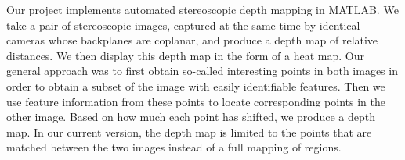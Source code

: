 Our project implements automated stereoscopic depth mapping in MATLAB.  We take a pair of stereoscopic images, captured at the same time by identical cameras whose backplanes are coplanar, and produce a depth map of relative distances. We then display this depth map in the form of a heat map.  Our general approach was to first obtain so-called interesting points in both images in order to obtain a subset of the image with easily identifiable features.  Then we use feature information from these points to locate corresponding points in the other image. Based on how much each point has shifted, we produce a depth map. In our current version, the depth map is limited to the points that are matched between the two images instead of a full mapping of regions.
